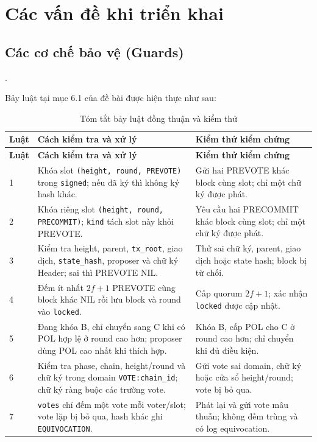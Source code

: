 \section{Các vấn đề khi triển khai}
\label{sec:implementation}

\subsection{Các cơ chế bảo vệ (Guards)}.

Bảy luật tại mục 6.1 của đề bài được hiện thực như sau:

\small
\setlength{\tabcolsep}{3pt}
\begin{longtable}{|p{0.8cm}|p{7.0cm}|p{4.6cm}|}
\caption{Tóm tắt bảy luật đồng thuận và kiểm thử}\label{tab:consensus-guards}\\
\hline
\textbf{Luật} & \textbf{Cách kiểm tra và xử lý} & \textbf{Kiểm thử kiểm chứng} \\
\hline
\endfirsthead
\hline
\textbf{Luật} & \textbf{Cách kiểm tra và xử lý} & \textbf{Kiểm thử kiểm chứng} \\
\hline
\endhead
1 & Khóa slot \texttt{(height, round, PREVOTE)} trong \texttt{signed}; nếu đã ký thì không ký hash khác. & Gửi hai PREVOTE khác block cùng slot; chỉ một chữ ký được phát. \\
\hline
2 & Khóa riêng slot \texttt{(height, round, PRECOMMIT)}; \texttt{kind} tách slot này khỏi PREVOTE. & Yêu cầu hai PRECOMMIT khác block cùng slot; chỉ một chữ ký được phát. \\
\hline
3 & Kiểm tra height, parent, \texttt{tx\_root}, giao dịch, \texttt{state\_hash}, proposer và chữ ký Header; sai thì PREVOTE NIL. & Thử sai chữ ký, parent, giao dịch hoặc state hash; block bị từ chối. \\
\hline
4 & Đếm ít nhất $2f+1$ PREVOTE cùng block khác NIL rồi lưu block và round vào \texttt{locked}. & Cấp quorum $2f+1$; xác nhận \texttt{locked} được cập nhật. \\
\hline
5 & Đang khóa B, chỉ chuyển sang C khi có POL hợp lệ ở round cao hơn; proposer dùng POL cao nhất khi thích hợp. & Khóa B, cấp POL cho C ở round cao hơn; chỉ chuyển khi đủ điều kiện. \\
\hline
6 & Kiểm tra phase, chain, height/round và chữ ký trong domain \texttt{VOTE:chain\_id}; chữ ký ràng buộc các trường vote. & Gửi vote sai domain, chữ ký hoặc cửa sổ height/round; vote bị bỏ qua. \\
\hline
7 & \texttt{votes} chỉ đếm một vote mỗi voter/slot; vote lặp bị bỏ qua, hash khác ghi \texttt{EQUIVOCATION}. & Phát lại và gửi vote mâu thuẫn; không đếm trùng và có log equivocation. \\
\hline
\end{longtable}
\normalsize
\setlength{\tabcolsep}{6pt}


